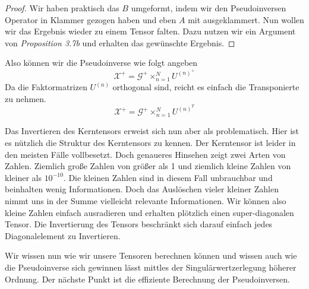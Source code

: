 \begin{Lemma}
\begin{proof}
Wir haben praktisch das $B$ umgeformt, indem wir den Pseudoinversen Operator in Klammer gezogen haben und eben $A$ mit ausgeklammert. Nun wollen wir das Ergebnis wieder zu einem Tensor falten. Dazu nutzen wir ein Argument von \cite[11]{Multilinear} \textit{Proposition 3.7b}
und erhalten das gewünschte Ergebnis.

\end{proof}
\end{Lemma}

Also können wir die Pseudoinverse wie folgt angeben
\begin{equation}
\pmb{\mathscr{X}}^+ = \pmb{\mathscr{G}}^{+} \times_{n=1}^{N} U^{ (n) ^{+} }
\end{equation}
Da die Faktormatrizen $U^{(n)}$ orthogonal sind, reicht es einfach die Transponierte zu nehmen. 
\begin{equation}
\pmb{\mathscr{X}}^+ = \pmb{\mathscr{G}}^{+} \times_{n=1}^{N} U^{ (n) ^{T} }
\end{equation}

Das Invertieren des Kerntensors erweist sich nun aber als problematisch.
Hier ist es nützlich die Struktur des Kerntensors zu kennen. Der Kerntensor ist leider in den meisten Fälle vollbesetzt. Doch genaueres Hinsehen zeigt zwei Arten von Zahlen. Ziemlich große Zahlen von größer als 1 und ziemlich kleine Zahlen von kleiner als $10^{-10}$. 
Die kleinen Zahlen sind in diesem Fall unbrauchbar und beinhalten wenig Informationen. Doch das Auslöschen vieler kleiner Zahlen nimmt uns in der Summe vielleicht relevante Informationen.
Wir können also kleine Zahlen einfach ausradieren und erhalten plötzlich einen super-diagonalen Tensor. Die Invertierung des Tensors beschränkt sich darauf einfach jedes Diagonalelement zu Invertieren.

Wir wissen nun wie wir unsere Tensoren berechnen können und wissen auch wie die Pseudoinverse sich gewinnen lässt mittles der Singulärwertzerlegung höherer Ordnung.
Der nächste Punkt ist die effiziente Berechnung der Pseudoinversen.



